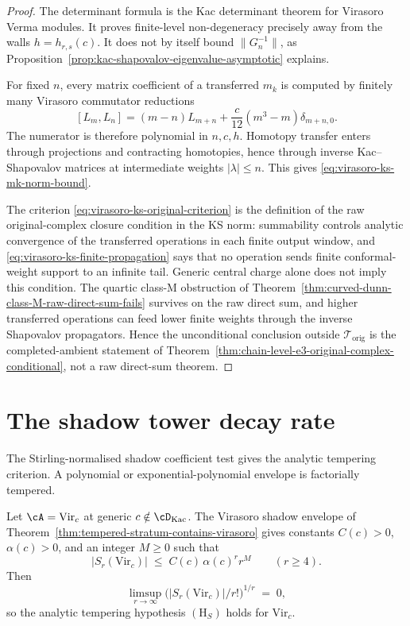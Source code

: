 \begin{proof}
The determinant formula is the Kac determinant theorem for Virasoro
Verma modules. It proves finite-level non-degeneracy precisely away
from the walls \(h=h_{r,s}(c)\). It does not by itself bound
\(\|G_n^{-1}\|\), as
Proposition~\ref{prop:kac-shapovalov-eigenvalue-asymptotic} explains.

For fixed \(n\), every matrix coefficient of a transferred \(m_k\) is
computed by finitely many Virasoro commutator reductions
\[
[L_m,L_n]=(m-n)L_{m+n}+\frac{c}{12}(m^3-m)\delta_{m+n,0}.
\]
The numerator is therefore polynomial in \(n,c,h\). Homotopy transfer
enters through projections and contracting homotopies, hence through
inverse Kac--Shapovalov matrices at intermediate weights
\(|\lambda|\le n\). This gives
\eqref{eq:virasoro-ks-mk-norm-bound}.

The criterion
\eqref{eq:virasoro-ks-original-criterion} is the definition of the
raw original-complex closure condition in the KS norm: summability
controls analytic convergence of the transferred operations in each
finite output window, and
\eqref{eq:virasoro-ks-finite-propagation} says that no operation sends
finite conformal-weight support to an infinite tail. Generic central
charge alone does not imply this condition. The quartic class-M
obstruction of
Theorem~\ref{thm:curved-dunn-class-M-raw-direct-sum-fails} survives on
the raw direct sum, and higher transferred operations can feed lower
finite weights through the inverse Shapovalov propagators. Hence the
unconditional conclusion outside \(\mathcal T_{\mathrm{orig}}\) is the
completed-ambient statement of
Theorem~\ref{thm:chain-level-e3-original-complex-conditional}, not a
raw direct-sum theorem.
\end{proof}

\section{The shadow tower decay rate}
\label{sec:shadow-tower-decay}

The Stirling-normalised shadow coefficient test gives the analytic
tempering criterion. A polynomial or exponential-polynomial envelope
is factorially tempered.

\begin{proposition}
\label{prop:shadow-decay-class-m}
Let $\cA = \mathrm{Vir}_c$ at generic $c \notin \cD_{\mathrm{Kac}}$.
The Virasoro shadow envelope of
Theorem~\ref{thm:tempered-stratum-contains-virasoro} gives constants
$C(c)>0$, $\alpha(c)>0$, and an integer $M\ge 0$ such that
\[
 \bigl\lvert S_r(\mathrm{Vir}_c) \bigr\rvert
 \;\le\;
 C(c)\,\alpha(c)^r r^M
 \qquad (r \ge 4).
\]
Then
\[
 \limsup_{r \to \infty}
 \bigl(\lvert S_r(\mathrm{Vir}_c) \rvert / r!\bigr)^{1/r}
 \;=\;
 0,
\]
so the analytic tempering hypothesis $(\mathrm{H}_S)$ holds for
$\mathrm{Vir}_c$.
\end{proposition}

